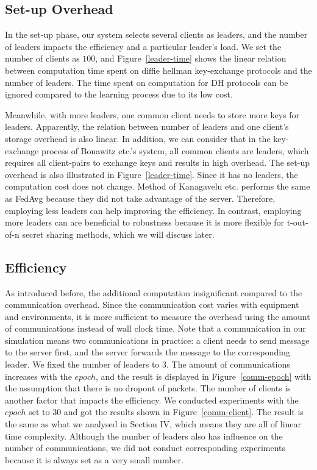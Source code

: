 \subsection{Set-up Overhead}
In the set-up phase, our system selects several clients as leaders, and the number of leaders impacts the efficiency and a particular leader's load. We set the number of clients as $100$, and Figure~\ref{leader-time} shows the linear relation between computation time spent on diffie hellman key-exchange protocols and the number of leaders. The time spent on computation for DH protocols can be ignored compared to the learning process due to its low cost.

Meanwhile, with more leaders, one common client needs to store more keys for leaders. Apparently, the relation between number of leaders and one client's storage overhead is also linear. In addition, we can consider that in the key-exchange process of Bonawitz etc.\cite{Practical}'s system, all common clients are leaders, which requires all client-pairs to exchange keys and results in high overhead. The set-up overhead is also illustrated in Figure~\ref{leader-time}. Since it has no leaders, the computation cost does not change. Method of Kanagavelu etc.\cite{Two-Phase} performs the same as FedAvg because they did not take advantage of the server. Therefore, employing less leaders can help improving the efficiency. In contrast, employing more leaders can are beneficial to robustness because it is more flexible for t-out-of-n secret sharing methods, which we will discuss later. 


\subsection{Efficiency}
As introduced before, the additional computation insignificant compared to the communication overhead. Since the communication cost varies with equipment and environments, it is more sufficient to measure the overhead using the amount of communications instead of wall clock time. Note that a communication in our simulation means two communications in practice: a client needs to send message to the server first, and the server forwards the message to the corresponding leader. We fixed the number of leaders to 3. The amount of communications increases with the $epoch$, and the result is displayed in Figure~\ref{comm-epoch} with the assumption that there is no dropout of packets. The number of clients is another factor that impacts the efficiency. We conducted experiments with the $epoch$ set to 30 and got the results shown in Figure~\ref{comm-client}. The result is the same as what we analysed in Section IV, which means they are all of linear time complexity. Although the number of leaders also has influence on the number of communications, we did not conduct corresponding experiments because it is always set as a very small number. 


